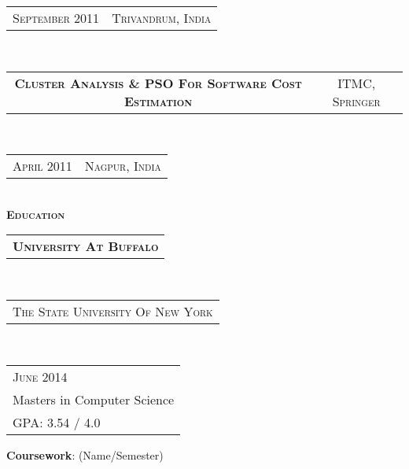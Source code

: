 \documentclass[10pt,a4paper,oneside]{article}
\begin{document}
    \textcolor{light-gray}{
        \begin{tabular}{c|c}
            {\small S\textsc{eptember 2011}}
            &{\small T\textsc{rivandrum}, I\textsc{ndia}}
        \end{tabular}
        \vspace{10pt}
    }\\ 
    \begin{tabular}{c|c}
        \textbf{\normalsize C\textsc{luster} A\textsc{nalysis} \& PSO F\textsc{or} S\textsc{oftware} C\textsc{ost} E\textsc{stimation}}
        &\textmd{\normalsize ITMC, S\textsc{pringer}}
    \end{tabular}\\
    \textcolor{light-gray}{
        \begin{tabular}{c|c}
            {\small A\textsc{pril 2011}}
            &{\small N\textsc{agpur}, I\textsc{ndia}}
        \end{tabular}
    }\\ 
    \hspace{2ex}
    \vspace{0pt}
    \textcolor{light-gray}{\textbf{\large E\textsc{ducation}}}
    \vspace{10pt}\\
    \begin{tabular}{c}
        \textbf{\normalsize U\textsc{niversity} A\textsc{t} B\textsc{uffalo}}
    \end{tabular}\\
    \textcolor{light-gray}{
        \begin{tabular}{l}
            {\small T\textsc{he} S\textsc{tate} U\textsc{niversity} O\textsc{f} N\textsc{ew} Y\textsc{ork}}
        \end{tabular}
    }\\ 
    \begin{tabular}{l}
        {\small J\textsc{une} 2014}\\
        {\small Masters in Computer Science }\\
        {\small GPA: 3.54 / 4.0}
    \end{tabular}
    \vspace{0pt}
    \begin{adjustwidth}{7pt}{0pt}
        {\small \textbf{Coursework}: (Name/Semester)}\\
    \end{adjustwidth}
    \vspace{-11pt}
\end{document}
